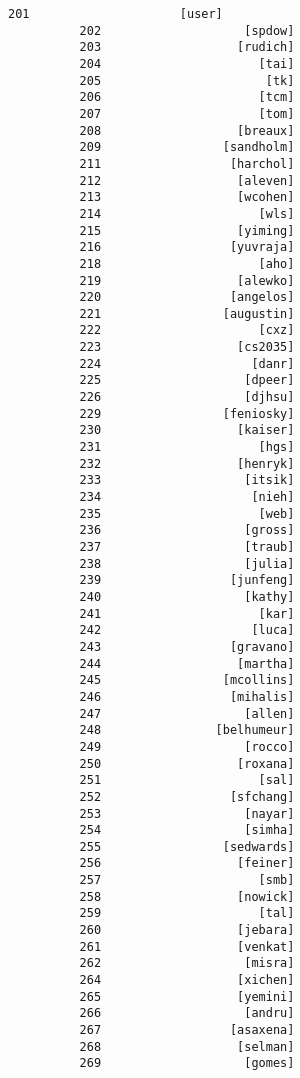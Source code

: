 \documentclass[11pt]{article}
\begin{document}
\begin{Verbatim}[commandchars=\\\{\}]
          201                     [user]
          202                    [spdow]
          203                   [rudich]
          204                      [tai]
          205                       [tk]
          206                      [tcm]
          207                      [tom]
          208                   [breaux]
          209                 [sandholm]
          211                  [harchol]
          212                   [aleven]
          213                   [wcohen]
          214                      [wls]
          215                   [yiming]
          216                  [yuvraja]
          218                      [aho]
          219                   [alewko]
          220                  [angelos]
          221                 [augustin]
          222                      [cxz]
          223                   [cs2035]
          224                     [danr]
          225                    [dpeer]
          226                    [djhsu]
          229                 [feniosky]
          230                   [kaiser]
          231                      [hgs]
          232                   [henryk]
          233                    [itsik]
          234                     [nieh]
          235                      [web]
          236                    [gross]
          237                    [traub]
          238                    [julia]
          239                  [junfeng]
          240                    [kathy]
          241                      [kar]
          242                     [luca]
          243                  [gravano]
          244                   [martha]
          245                 [mcollins]
          246                  [mihalis]
          247                    [allen]
          248                [belhumeur]
          249                    [rocco]
          250                   [roxana]
          251                      [sal]
          252                  [sfchang]
          253                    [nayar]
          254                    [simha]
          255                 [sedwards]
          256                   [feiner]
          257                      [smb]
          258                   [nowick]
          259                      [tal]
          260                   [jebara]
          261                   [venkat]
          262                    [misra]
          264                   [xichen]
          265                   [yemini]
          266                    [andru]
          267                  [asaxena]
          268                   [selman]
          269                    [gomes]

\end{Verbatim}
\end{document}
